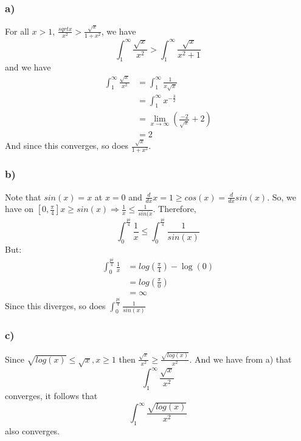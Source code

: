 \documentclass{article}
\begin{document}
\subsubsection*{a)}
For all $x>1$, $\frac{sqrt{x}}{x^{2}} > \frac{\sqrt{x}}{1+x^{2}}$, we have
\begin{equation}
\int_{1}^{\infty} \frac{\sqrt{x}}{x^{2}} >\int_{1}^{\infty} \frac{\sqrt{x}}{x^{2}+1}
\end{equation}
and we have \begin{align*}
\int_{1}^{\infty} \frac{\sqrt{x}}{x^{2}} &= \int_{1}^{\infty} \frac{1}{x\sqrt{x}}\\
&= \int_{1}^{\infty} x^{-\frac{3}{2}}\\
&= \lim_{x \rightarrow \infty} \left(\frac{-2}{\sqrt{x}} + 2 \right)\\
&= 2
\end{align*}
And since this converges, so does $ \frac{\sqrt{x}}{1+x^{2}}$.
\subsubsection*{b)}
Note that $sin(x) = x$ at $x=0$ and $\frac{d}{dx}x = 1 \geq cos(x) = \frac{d}{dx} sin(x)$. So, we have on $[0, \frac{\pi}{4}] x \geq sin(x) \Rightarrow \frac{1}{x} \leq \frac{1}{sin(x}$. Therefore, 
\begin{equation*}
\int_{0}^{\frac{pi}{4}} \frac{1}{x} \leq \int_{0}^{\frac{pi}{4}} \frac{1}{sin(x)} 
\end{equation*}
But:
\begin{align*}
\int_{0}^{\frac{pi}{4}} \frac{1}{x}  &= log(\frac{\pi}{4}) - \log(0)\\
&= log(\frac{\pi}{0})\\
&= \infty
\end{align*}
Since this diverges, so does $\int_{0}^{\frac{pi}{4}} \frac{1} {sin(x)}$
\subsubsection*{c)}
Since $\sqrt{log(x)} \leq \sqrt{x}, x\geq 1$ then $\frac{\sqrt{x}}{x^{2}} \geq \frac{\sqrt{log(x)}}{x^{2}}$.
And we have from a) that
\begin{equation*}
\int_{1}^{\infty} \frac{\sqrt{x}}{x^{2}}
\end{equation*}
converges, it follows that 
\begin{equation*}
\int_{1}^{\infty} \frac{\sqrt{log(x)}}{x^{2}}
\end{equation*}
also converges.
\end{document}
